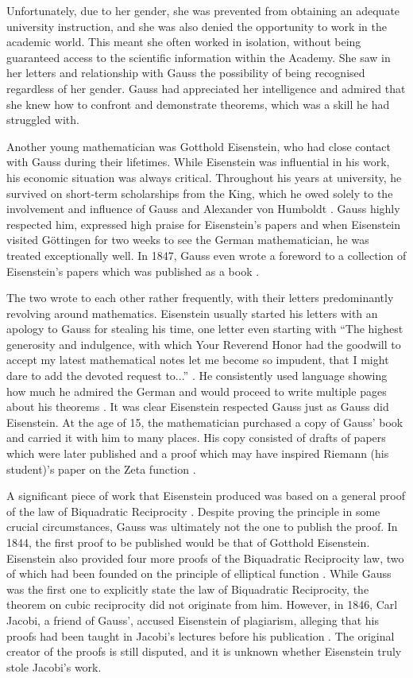 \documentclass{article}
\begin{document}
Unfortunately, due to her gender, she was prevented from obtaining an adequate university instruction, and she was also denied the opportunity to work in the academic world. This meant she often worked in isolation, without being guaranteed access to the scientific information within the Academy. She saw in her letters and relationship with Gauss the possibility of being recognised regardless of her gender. Gauss had appreciated her intelligence and admired that she knew how to confront and demonstrate theorems, which was a skill he had struggled with. 

Another young mathematician was Gotthold Eisenstein, who had close contact with Gauss during their lifetimes. While Eisenstein was influential in his work, his economic situation was always critical. Throughout his years at university, he survived on short-term scholarships from the King, which he owed solely to the involvement and influence of Gauss and Alexander von Humboldt \cite{schmitz}. Gauss highly respected him, expressed high praise for Eisenstein’s papers and when Eisenstein visited G\"{o}ttingen for two weeks to see the German mathematician, he was treated exceptionally well. In 1847, Gauss even wrote a foreword to a collection of Eisenstein’s papers which was published as a book \cite{Schappacher1998}. 

The two wrote to each other rather frequently, with their letters predominantly revolving around mathematics. Eisenstein usually started his letters with an apology to Gauss for stealing his time, one letter even starting with “The highest generosity and indulgence, with which Your Reverend Honor had the goodwill to accept my latest mathematical notes let me become so impudent, that I might dare to add the devoted request to...” \cite{schmitz}. He consistently used language showing how much he admired the German and would proceed to write multiple pages about his theorems \cite{schmitz}. It was clear Eisenstein respected Gauss just as Gauss did Eisenstein. At the age of 15, the mathematician purchased a copy of Gauss’ book and carried it with him to many places. His copy consisted of drafts of papers which were later published and a proof which may have inspired Riemann (his student)’s paper on the Zeta function \cite{riemann}.

A significant piece of work that Eisenstein produced was based on a general proof of the law of Biquadratic Reciprocity \cite{schmitz}. Despite proving the principle in some crucial circumstances, Gauss was ultimately not the one to publish the proof. In 1844, the first proof to be published would be that of Gotthold Eisenstein. Eisenstein also provided four more proofs of the Biquadratic Reciprocity law, two of which had been founded on the principle of elliptical function \cite{collison}. While Gauss was the first one to explicitly state the law of Biquadratic Reciprocity, the theorem on cubic reciprocity did not originate from him. However, in 1846, Carl Jacobi, a friend of Gauss', accused Eisenstein of plagiarism, alleging that his proofs had been taught in Jacobi's lectures before his publication \cite{collison}. The original creator of the proofs is still disputed, and it is unknown whether Eisenstein truly stole Jacobi’s work.  
\end{document}
